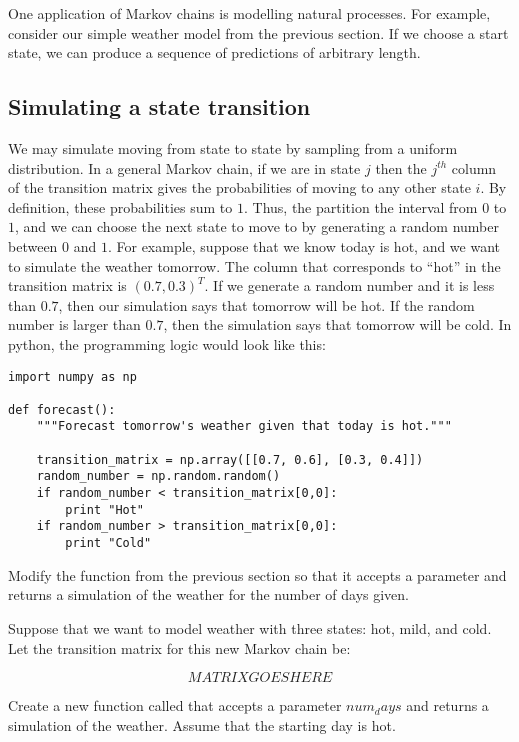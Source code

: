 One application of Markov chains is modelling natural processes.
For example, consider our simple weather model from the previous section.
If we choose a start state, we can produce a sequence of predictions of arbitrary length.

\subsection*{Simulating a state transition}
We may simulate moving from state to state by sampling from a uniform distribution.
In a general Markov chain, if we are in state $j$ then the $j^{th}$ column of the transition matrix gives the probabilities of moving to any other state $i$.
By definition, these probabilities sum to $1$.
Thus, the partition the interval from $0$ to $1$, and we can choose the next state to move to by generating a random number between $0$ and $1$.
For example, suppose that we know today is hot, and we want to simulate the weather tomorrow.
The column that corresponds to ``hot'' in the transition matrix is $(0.7, 0.3)^T$.
If we generate a random number and it is less than $0.7$, then our simulation says that tomorrow will be hot.
If the random number is larger than $0.7$, then the simulation says that tomorrow will be cold.
In python, the programming logic would look like this:

\begin{lstlisting}
import numpy as np

def forecast():
	"""Forecast tomorrow's weather given that today is hot."""

	transition_matrix = np.array([[0.7, 0.6], [0.3, 0.4]])
	random_number = np.random.random()
	if random_number < transition_matrix[0,0]:
		print "Hot"
	if random_number > transition_matrix[0,0]:
		print "Cold"
\end{lstlisting}

\begin{problem}
Modify the  function from the previous section so that it accepts a parameter  and returns a simulation of the weather for the number of days given.
\end{problem}

\begin{problem}
Suppose that we want to model weather with three states: hot, mild, and cold.
Let the transition matrix for this new Markov chain be:

\[
MATRIX GOES HERE
\]

Create a new function called  that accepts a parameter $num_days$ and returns a simulation of the weather.
Assume that the starting day is hot.
\end{problem}

